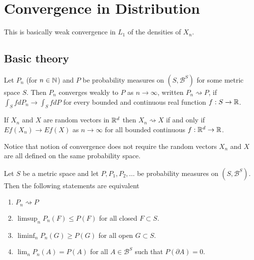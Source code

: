 \clearpage
%
%
\section{Convergence in Distribution}
This is basically weak convergence in $L_1$ of the densities of $X_n$.



\subsection{Basic theory}



\begin{definition}
Let $P_n$ (for $n\in \Bbb N$) and $P$ be probability measures on $(S,\mathcal B^S)$ for some metric space $S$. Then $P_n$ converges weakly to $P$ as $n\rightarrow \infty$, written $P_n\rightsquigarrow P$, if $\int_S f dP_n\rightarrow  \int_S f dP$  for every bounded and continuous real function $f:S\rightarrow \Bbb R$.
\end{definition}



\begin{definition}
If $X_n$ and $X$ are random vectors in $\Bbb R^d$  then $X_n\rightsquigarrow X$ if and only if $Ef(X_n) \rightarrow Ef(X)$ as $n\rightarrow \infty$ for all bounded continuous $f:\Bbb R^d\rightarrow \Bbb R$.
\end{definition}




Notice that notion of convergence does not require the random vectors $X_n$ and $X$ are all defined on the same probability space.




\begin{theorem}[{\bf Portmanteau I}]
Let $S$ be a metric space and let $P, P_1, P_2, \ldots$ be probability measures on $(S, \mathcal B^S)$. Then the following statements are equivalent
\begin{enumerate}
\item $P_n\rightsquigarrow P$
\item $\limsup_{n} P_n(F) \leq P(F)$ for all closed $F\subset S$.
\item $\liminf_{n} P_n(G) \geq P(G)$ for all open $G\subset S$.
\item $\lim_n P_n(A)= P(A)$ for all $A\in \mathcal B^S$ such that $P(\partial A) = 0$.
\end{enumerate}
\end{theorem}


